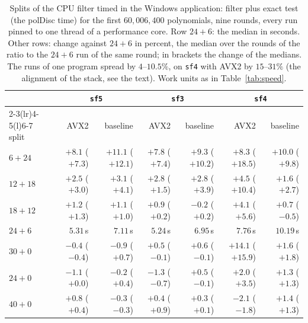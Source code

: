 \documentclass[10pt,a4paper]{article}
\newcommand{\code}[1]{\texttt{#1}}
\theoremstyle{plain}
\theoremstyle{definition}
\begin{document}
\begin{table}[ht]
\centering\footnotesize\setlength{\tabcolsep}{3pt}
\caption{Splits of the CPU filter timed in the Windows application: filter plus exact test (the polDisc time) for the first $60{,}006{,}400$ polynomials, nine
rounds, every run pinned to one thread of a performance core.  Row $24+6$: the median in seconds.  Other rows: change against $24+6$ in percent, the median over
the rounds of the ratio to the $24+6$ run of the same round; in brackets the change of the medians.  The runs of one program spread by $4$--$10.5\%$, on
\code{sf4} with AVX2 by $15$--$31\%$ (the alignment of the stack, see the text).  Work units as in
Table~\ref{tab:speed}.}\label{tab:splitapp}
\begin{tabular}{@{}lrrrrrr@{}}
\toprule
& \multicolumn{2}{c}{\code{sf5}} & \multicolumn{2}{c}{\code{sf3}} & \multicolumn{2}{c}{\code{sf4}} \\ \cmidrule(lr){2-3}\cmidrule(lr){4-5}\cmidrule(l){6-7}
split & AVX2 & baseline & AVX2 & baseline & AVX2 & baseline \\ \midrule
$6+24$  & $+8.1$ ($+7.3$) & $+11.1$ ($+12.1$) & $+7.8$ ($+7.4$) & $+9.3$ ($+10.2$) & $+8.3$ ($+18.5$) & $+10.0$ ($+9.8$) \\
$12+18$ & $+2.5$ ($+3.0$) & $+3.1$ ($+4.1$)   & $+2.8$ ($+1.5$) & $+2.8$ ($+3.9$)  & $+4.5$ ($+10.4$) & $+1.6$ ($+2.7$) \\
$18+12$ & $+1.2$ ($+1.3$) & $+1.1$ ($+1.0$)   & $+0.9$ ($+0.2$) & $-0.2$ ($+0.2$)  & $+4.1$ ($+5.6$)  & $+0.7$ ($-0.5$) \\
$24+6$  & $5.31$\,s       & $7.11$\,s         & $5.24$\,s       & $6.95$\,s        & $7.76$\,s        & $10.19$\,s \\
$30+0$  & $-0.4$ ($-0.4$) & $-0.9$ ($+0.7$)   & $+0.5$ ($-0.1$) & $+0.6$ ($-0.1$)  & $+14.1$ ($+15.9$) & $+1.6$ ($+1.8$) \\
$24+0$  & $-1.1$ ($+0.0$) & $-0.2$ ($+0.4$)   & $-1.3$ ($-0.7$) & $+0.5$ ($-0.1$)  & $+2.0$ ($+3.5$)  & $+1.3$ ($+1.3$) \\
$40+0$  & $+0.8$ ($+0.4$) & $-0.3$ ($-0.3$)   & $+0.4$ ($+0.9$) & $+0.3$ ($+0.1$)  & $-2.1$ ($-1.8$)  & $+1.4$ ($+1.3$) \\ \bottomrule
\end{tabular}
\end{table}
\end{document}
